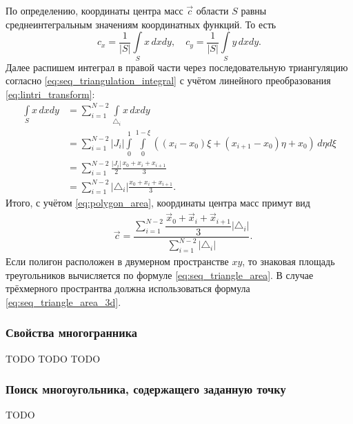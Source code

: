 \label{sec:polygon_center} 
По определению, координаты центра масс $\vec c$ области $S$ равны среднеинтегральным значениям координатных функций. То есть
\begin{equation*}
c_x = \frac{1}{|S|}\int\limits_{S} x \, dxdy,
\quad 
c_y = \frac{1}{|S|}\int\limits_{S} y \, dxdy.
\end{equation*}
Далее распишем интеграл в правой части через последовательную триангуляцию согласно
\cref{eq:seq_triangulation_integral} с учётом линейного преобразования
\cref{eq:lintri_transform}:
\begin{align*}
\int\limits_{S} x \, dxdy &= \sum_{i=1}^{N-2} \int\limits_{\triangle_i} x \, dxdy\\
                          &= \sum_{i=1}^{N-2} |J_i| \int\limits_0^1\int\limits_0^{1-\xi} ((x_i - x_0)\xi + (x_{i+1} - x_0)\eta + x_0)\, d\eta d\xi\\
                          &= \sum_{i=1}^{N-2} \frac{|J_i|}{2}\frac{x_0 + x_i + x_{i+1}}{3}\\
                          &= \sum_{i=1}^{N-2} |\triangle_i|\frac{x_0 + x_i + x_{i+1}}{3}.
\end{align*}
Итого, с учётом \cref{eq:polygon_area}, координаты центра масс примут вид
\begin{align*}
&\vec c = \dfrac{\displaystyle\sum_{i=1}^{N-2} \dfrac{\vec x_0 + \vec x_i + \vec x_{i+1}}{3}|\triangle_i|}{\displaystyle\sum_{i=1}^{N-2} |\triangle_i|}.
\end{align*}
Если полигон расположен в двумерном пространстве $xy$, то знаковая площадь треугольников
вычисляется по формуле \cref{eq:seq_triangle_area}.
В случае трёхмерного пространтва должна использоваться формула \cref{eq:seq_triangle_area_3d}.

\subsubsection{Свойства многогранника}
\label{sec:polyhedron_volume} 
TODO
\label{sec:polyhedron_integral} 
TODO
\label{sec:polyhedron_center} 
TODO

\subsubsection{Поиск многоугольника, содержащего заданную точку}
TODO
